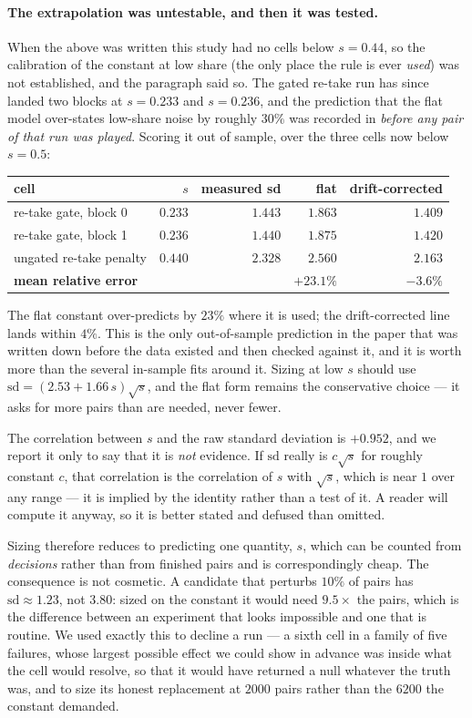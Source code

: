 \documentclass[11pt,letterpaper]{article}
\begin{document}
\paragraph{The extrapolation was untestable, and then it was tested.} When the
above was written this study had no cells below $s = 0.44$, so the calibration
of the constant at low share (the only place the rule is ever \emph{used})
was not established, and the paragraph said so. The gated re-take run has since
landed two blocks at $s = 0.233$ and $s = 0.236$, and the prediction that the
flat model over-states low-share noise by roughly $30\%$ was recorded in
 \emph{before any pair of that run
was played}. Scoring it out of sample, over the three cells now below $s = 0.5$:
\begin{center}
\begin{tabular}{lrrrr}
\toprule
cell & $s$ & measured sd & flat & drift-corrected \\
\midrule
re-take gate, block 0 & $0.233$ & $1.443$ & $1.863$ & $1.409$ \\
re-take gate, block 1 & $0.236$ & $1.440$ & $1.875$ & $1.420$ \\
ungated re-take penalty & $0.440$ & $2.328$ & $2.560$ & $2.163$ \\
\midrule
\multicolumn{2}{l}{\textbf{mean relative error}} & &
  $\mathbf{+23.1\%}$ & $\mathbf{-3.6\%}$ \\
\bottomrule
\end{tabular}
\end{center}
The flat constant over-predicts by $23\%$ where it is used; the drift-corrected
line lands within $4\%$. This is the only out-of-sample prediction in the paper
that was written down before the data existed and then checked against it, and
it is worth more than the several in-sample fits around it. Sizing at low $s$
should use $\mathrm{sd} = (2.53 + 1.66\,s)\sqrt{s}$, and the flat form remains
the conservative choice --- it asks for more pairs than are needed, never
fewer.

The correlation between $s$ and the raw standard deviation is $+0.952$, and we
report it only to say that it is \emph{not} evidence. If $\mathrm{sd}$ really is
$c\sqrt{s}$ for roughly constant $c$, that correlation is the correlation of $s$
with $\sqrt{s}$, which is near $1$ over any range --- it is implied by the
identity rather than a test of it. A reader will compute it anyway, so it is
better stated and defused than omitted.

Sizing therefore reduces to predicting one quantity, $s$, which can be counted
from \emph{decisions} rather than from finished pairs and is correspondingly
cheap. The consequence is not cosmetic. A candidate that perturbs $10\%$ of pairs
has $\mathrm{sd} \approx 1.23$, not $3.80$: sized on the constant it would need
$9.5\times$ the pairs, which is the difference between an experiment that looks
impossible and one that is routine. We used exactly this to decline a run --- a
sixth cell in a family of five failures, whose largest possible effect we could
show in advance was inside what the cell would resolve, so that it would have
returned a null whatever the truth was, and to size its honest replacement at
$2000$ pairs rather than the $6200$ the constant demanded.
\end{document}
